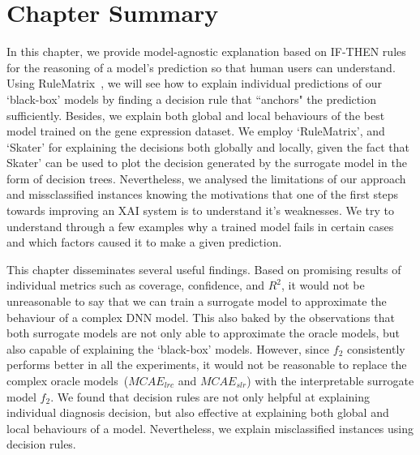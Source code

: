 
\section{Chapter Summary} \label{chapter_7:conclusion}
In this chapter, we provide model-agnostic explanation based on IF-THEN rules for the reasoning of a model's prediction so that human users can understand. %
Using RuleMatrix~\cite{ming2018rulematrix}, we will see how to explain individual predictions of our `black-box' models by finding a decision rule that ``anchors" the prediction sufficiently. Besides, we explain both global and local behaviours of the best model trained on the gene expression dataset. We employ `RuleMatrix', and `Skater' for explaining the decisions both globally and locally, given the fact that Skater' can be used to plot the decision generated by the surrogate model in the form of decision trees.  
Nevertheless, we analysed the limitations of our approach and missclassified instances knowing the motivations that one of the first steps towards improving an XAI system is to understand it’s weaknesses. We try to understand through a few examples why a trained model fails in certain cases and which factors caused it to make a given prediction. 

\hspace*{3.5mm} This chapter disseminates several useful findings. Based on promising results of individual metrics such as coverage, confidence, and $R^2$, it would not be unreasonable to say that we can train a surrogate model to approximate the behaviour of a complex DNN model. This also baked by the observations that both surrogate models are not only able to approximate the oracle models, but also capable of  explaining the `black-box' models. However, since $f_2$ consistently performs better in all the experiments, it would not be reasonable to replace the complex oracle models~($MCAE_{lrc}$ and $MCAE_{slr}$) with the interpretable surrogate model $f_2$. We found that decision rules are not only helpful at explaining individual diagnosis decision, but also effective at explaining both global and local behaviours of a model. Nevertheless, we explain misclassified instances using decision rules. 

